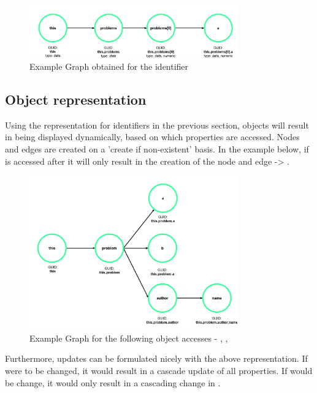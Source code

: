 \begin{figure}[H]
    \includegraphics[width=0.8\textwidth]{images/graph_simple.png}
     \caption{Example Graph obtained for the identifier  }
     \label{fig:graph_simple}
\end{figure}

\subsection{Object representation}

Using the representation for identifiers in the previous section, objects will result in being displayed dynamically, based on which properties are accessed. Nodes and edges are created on a 'create if non-existent' basis. In the example below, if  is accessed after  it will only result in the creation of the node  and edge  -> .

\begin{figure}[H]
    \includegraphics[width=0.8\textwidth]{images/graph_object.png}
     \caption{Example Graph for the following object accesses - , ,   }
     \label{fig:graph_object}
\end{figure}

Furthermore, updates can be formulated nicely with the above representation. If  were to be changed, it would result in a cascade update of all properties. If  would be change, it would only result in a cascading change in . 

